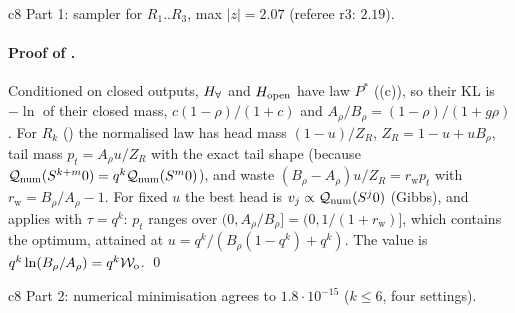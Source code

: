c8 Part 1: sampler for $R_1..R_3$, max $\lvert z\rvert=2.07$ (referee r3: $2.19$).

\paragraph{Proof of .} Conditioned on closed outputs, $H_{\forall}$ and $H_{\mathrm{open}}$ have law $P^*$ ((c)), so their KL is $-\ln$ of their closed mass, $c(1-\rho)/(1+c)$ and $A_\rho/B_\rho=(1-\rho)/(1+g\rho)$. For $R_k$ () the normalised law has head mass $(1-u)/Z_R$, $Z_R=1-u+uB_\rho$, tail mass $p_t=A_\rho u/Z_R$ with the exact tail shape (because $\mathcal{Q}_{\mathrm{num}}(S^{k+m}0)=q^k\mathcal{Q}_{\mathrm{num}}(S^m0)$), and waste $(B_\rho-A_\rho)u/Z_R=r_{\mathrm w}p_t$ with $r_{\mathrm w}=B_\rho/A_\rho-1$. For fixed $u$ the best head is $v_j\propto\mathcal{Q}_{\mathrm{num}}(S^j0)$ (Gibbs), and  applies with $\tau=q^k$: $p_t$ ranges over $(0,A_\rho/B_\rho]=(0,1/(1+r_{\mathrm w})]$, which contains the optimum, attained at $u=q^k/(B_\rho(1-q^k)+q^k)$. The value is $q^k\ln(B_\rho/A_\rho)=q^k\mathcal{W}_{\mathrm{o}}$. \qed

c8 Part 2: numerical minimisation agrees to $1.8\cdot10^{-15}$ ($k\le6$, four settings).

